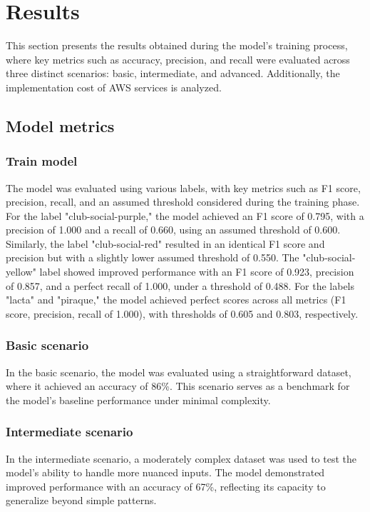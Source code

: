 \section{Results}

This section presents the results obtained during the model's training process, where key metrics such as accuracy, precision, and recall were evaluated across three distinct scenarios: basic, intermediate, and advanced. Additionally, the implementation cost of AWS services is analyzed.


\subsection{Model metrics}

\subsubsection{Train model}

The model was evaluated using various labels, with key metrics such as F1 score, precision, recall, and an assumed threshold considered during the training phase. For the label "club-social-purple," the model achieved an F1 score of 0.795, with a precision of 1.000 and a recall of 0.660, using an assumed threshold of 0.600. Similarly, the label "club-social-red" resulted in an identical F1 score and precision but with a slightly lower assumed threshold of 0.550. The "club-social-yellow" label showed improved performance with an F1 score of 0.923, precision of 0.857, and a perfect recall of 1.000, under a threshold of 0.488. For the labels "lacta" and "piraque," the model achieved perfect scores across all metrics (F1 score, precision, recall of 1.000), with thresholds of 0.605 and 0.803, respectively.

\subsubsection{Basic scenario}

In the basic scenario, the model was evaluated using a straightforward dataset, where it achieved an accuracy of 86\%. This scenario serves as a benchmark for the model's baseline performance under minimal complexity.

\subsubsection{Intermediate scenario}

In the intermediate scenario, a moderately complex dataset was used to test the model's ability to handle more nuanced inputs. The model demonstrated improved performance with an accuracy of 67\%, reflecting its capacity to generalize beyond simple patterns.

